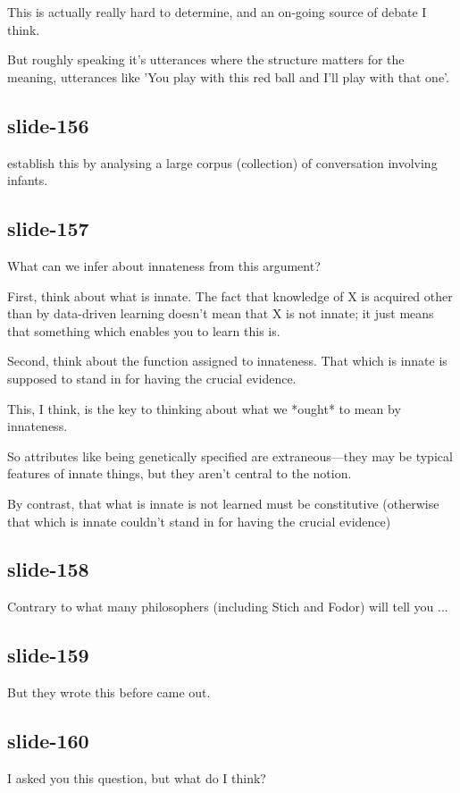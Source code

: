 \documentclass[12pt,\papersize]{extarticle}
\begin{document}
This is actually really hard to determine, and an on-going source of debate I think.

But roughly speaking it's utterances where the structure matters for the meaning, utterances like 'You play with this red ball and I'll play with that one'.

\subsection{slide-156}
\citet{lidz:2003_what} establish this by analysing a large corpus (collection) of conversation involving infants.

\subsection{slide-157}
What can we infer about innateness from this argument?

First, think about what is innate.  The fact that knowledge of X is acquired other than by data-driven learning doesn't mean that X is not innate; it just means that something which enables you to learn this is.

Second, think about the function assigned to innateness.  That which is innate is supposed to stand in for having the crucial evidence.

This, I think, is the key to thinking about what we *ought* to mean by innateness.

So attributes like being genetically specified are extraneous---they may be typical features of innate things, but they aren't central to the notion.

By contrast, that what is innate is not learned must be constitutive (otherwise that which is innate couldn't stand in for having the crucial evidence)

\subsection{slide-158}
Contrary to what many philosophers (including Stich and Fodor) will tell you ...

\subsection{slide-159}
But they wrote this before \citet{lidz:2003_what} came out.

\subsection{slide-160}
I asked you this question, but what do I think?
\end{document}
